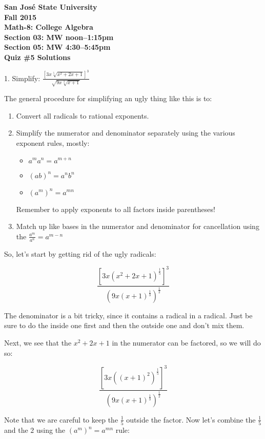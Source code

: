 \documentclass[letterpaper, 12pt]{article}
\begin{document}
\begin{center}
\bfseries
San Jos\'{e} State University \\
Fall 2015 \\
Math-8: College Algebra \\
Section 03: MW noon--1:15pm \\
Section 05: MW 4:30--5:45pm \\
\bigskip
Quiz \#5 Solutions
\end{center}

\bigskip

1. Simplify:
    $\frac{\left[3x\sqrt[5]{x^2+2x+1}\right]^3}{\sqrt{9x\sqrt[3]{x+1}}}$

\bigskip

The general procedure for simplifying an ugly thing like this is to:
\begin{enumerate}
\item{Convert all radicals to rational exponents.}
\item{Simplify the numerator and denominator separately using the various
exponent rules, mostly:
\begin{itemize}
\item{$a^ma^n=a^{m+n}$}
\item{$(ab)^n=a^nb^n$}
\item{$(a^m)^n=a^{mn}$}
\end{itemize}
Remember to apply exponents to all factors inside parentheses!
}
\item{Match up like bases in the numerator and denominator for cancellation
using the $\frac{a^m}{a^n}=a^{m-n}$}
\end{enumerate}

So, let's start by getting rid of the ugly radicals:

\[\frac{\left[3x(x^2+2x+1)^{\frac{1}{5}}\right]^3}
{(9x(x+1)^{\frac{1}{3}})^{\frac{1}{2}}}\]

The denominator is a bit tricky, since it contains a radical in a radical.
Just be sure to do the inside one first and then the outside one and don't
mix them.

Next, we see that the $x^2+2x+1$ in the numerator can be factored, so we will
do so:

\[\frac{\left[3x((x+1)^2)^{\frac{1}{5}}\right]^3}
{(9x(x+1)^{\frac{1}{3}})^{\frac{1}{2}}}\]

Note that we are careful to keep the $\frac{1}{5}$ outside the factor. Now
let's combine the $\frac{1}{5}$ and the $2$ using the $(a^m)^n=a^{mn}$ rule:
\end{document}
